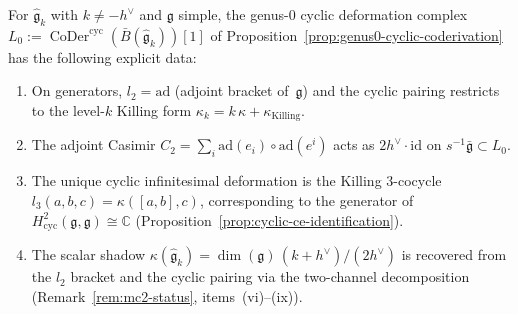 \begin{corollary}\label{cor:km-cyclic-deformation}
For $\widehat{\mathfrak{g}}_k$ with $k\neq -h^\vee$ and
$\mathfrak{g}$ simple, the genus-$0$ cyclic deformation complex
$L_0 := \operatorname{CoDer}^{\mathrm{cyc}}(\bar{B}
(\widehat{\mathfrak{g}}_k))[1]$
of Proposition~\textup{\ref{prop:genus0-cyclic-coderivation}}
has the following explicit data:
\begin{enumerate}[label=\textup{(\roman*)}]
\item On generators, $l_2 = \mathrm{ad}$ \textup{(}adjoint
  bracket of~$\mathfrak{g}$\textup{)} and the cyclic pairing
  restricts to the level-$k$ Killing form
  $\kappa_k = k\,\kappa + \kappa_{\mathrm{Killing}}$.
\item The adjoint Casimir
  $C_2 = \sum_i \mathrm{ad}(e_i)\circ\mathrm{ad}(e^i)$
  acts as $2h^\vee\cdot\mathrm{id}$ on
  $s^{-1}\bar{\mathfrak{g}} \subset L_0$.
\item The unique cyclic infinitesimal deformation is
  the Killing $3$-cocycle
  $l_3(a,b,c) = \kappa([a,b],c)$, corresponding to the
  generator of $H^2_{\mathrm{cyc}}(\mathfrak{g},\mathfrak{g})
  \cong\mathbb{C}$
  \textup{(}Proposition~\textup{\ref{prop:cyclic-ce-identification}}\textup{)}.
\item The scalar shadow
  $\kappa(\widehat{\mathfrak{g}}_k) =
  \dim(\mathfrak{g})\,(k+h^\vee)/(2h^\vee)$
  is recovered from the $l_2$ bracket and the cyclic pairing via
  the two-channel decomposition
  \textup{(}Remark~\textup{\ref{rem:mc2-status}},
  items~\textup{(vi)--(ix)}\textup{)}.
\end{enumerate}
\end{corollary}

